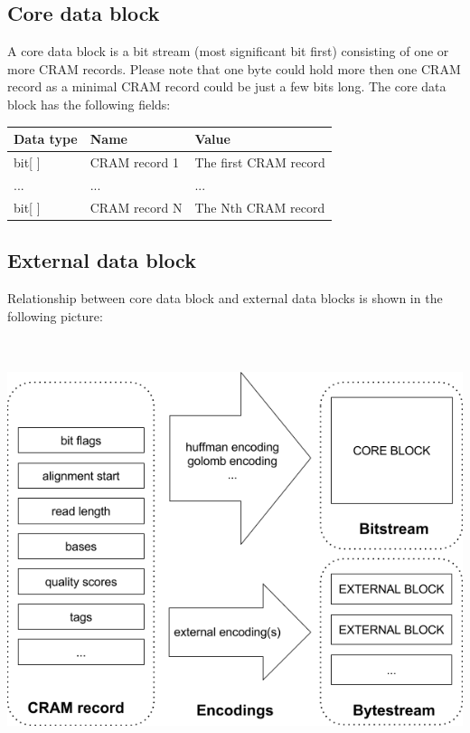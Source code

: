 \documentclass[a4paper]{article}
\begin{document}
\subsection{\textbf{Core data block}}

A core data block is a bit stream (most significant bit first) consisting of one 
or more CRAM records. Please note that one byte could hold more then one CRAM record 
as a minimal CRAM record could be just a few bits long. The core data block has 
the following fields:

\begin{tabular}{|l|>{\raggedright}p{120pt}|>{\raggedright}p{260pt}|}
\hline
\textbf{Data type} & \textbf{Name} & \textbf{Value}
\tabularnewline
\hline
bit[ ] & CRAM record 1 & The first CRAM record\tabularnewline
\hline
... & ... & ...\tabularnewline
\hline
bit[ ] & CRAM record N & The Nth CRAM record \tabularnewline
\hline
\end{tabular}

\subsection{\textbf{External data block}}

Relationship between core data block and external data blocks is shown in the following 
picture: 

\includegraphics[width=451pt, height=350pt, keepaspectratio=true]{img/CRAMFileFormat2-1-fig007.png}
\end{document}
